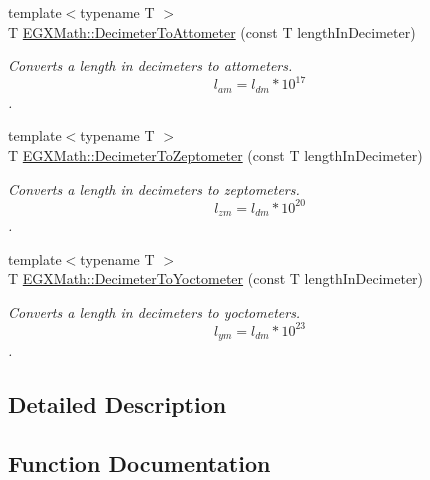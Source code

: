 \begin{DoxyCompactItemize}
{\footnotesize template$<$typename T $>$ }\\T \mbox{\hyperlink{group___e_g_x_math-_conversions-_length_conversions-_decimeter-_s_i_ga9b13c4c4f05e01a1e28293b26b69e01a}{E\+G\+X\+Math\+::\+Decimeter\+To\+Attometer}} (const T length\+In\+Decimeter)
\begin{DoxyCompactList}\small\item\em Converts a length in decimeters to attometers. \[ l_{am}=l_{dm} * 10^{17} \]. \end{DoxyCompactList}\item 
{\footnotesize template$<$typename T $>$ }\\T \mbox{\hyperlink{group___e_g_x_math-_conversions-_length_conversions-_decimeter-_s_i_ga5462e9c56431f0cf1daeafb729eeed24}{E\+G\+X\+Math\+::\+Decimeter\+To\+Zeptometer}} (const T length\+In\+Decimeter)
\begin{DoxyCompactList}\small\item\em Converts a length in decimeters to zeptometers. \[ l_{zm}=l_{dm} * 10^{20} \]. \end{DoxyCompactList}\item 
{\footnotesize template$<$typename T $>$ }\\T \mbox{\hyperlink{group___e_g_x_math-_conversions-_length_conversions-_decimeter-_s_i_ga9da3b12a8bfe244f7af0cc13cf0de4a8}{E\+G\+X\+Math\+::\+Decimeter\+To\+Yoctometer}} (const T length\+In\+Decimeter)
\begin{DoxyCompactList}\small\item\em Converts a length in decimeters to yoctometers. \[ l_{ym}=l_{dm} * 10^{23} \]. \end{DoxyCompactList}\end{DoxyCompactItemize}


\subsection{Detailed Description}


\subsection{Function Documentation}
\mbox{\label{group___e_g_x_math-_conversions-_length_conversions-_decimeter-_s_i_ga9b13c4c4f05e01a1e28293b26b69e01a}} 
